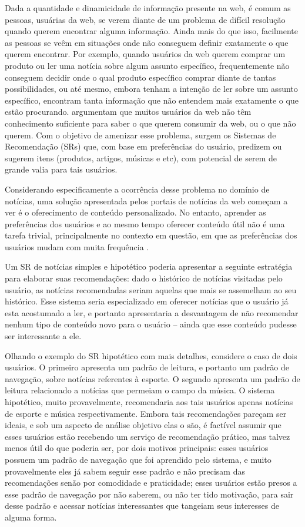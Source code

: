 \documentclass[normaltoc, espacoumemeio, pnumromarab,ruledheader]{abnt}
\begin{document}
Dada a quantidade e dinamicidade de informação presente na web, é comum as pessoas, usuárias da web, se verem diante de um problema de difícil resolução quando querem encontrar alguma informação. Ainda mais do que isso, facilmente as pessoas se veêm em situações onde não conseguem definir exatamente o que querem encontrar. Por exemplo, quando usuários da web querem comprar um produto ou ler uma notícia sobre algum assunto específico, frequentemente não conseguem decidir onde o qual produto específico comprar diante de tantas possibilidades, ou até mesmo, embora tenham a intenção de ler sobre um assunto específico, encontram tanta informação que não entendem mais exatamente o que estão procurando.  argumentam que muitos usuários da web não têm conhecimento suficiente para saber o que querem consumir da web, ou o que não querem. Com o objetivo de amenizar esse problema, surgem os Sistemas de Recomendação (SRs) que, com base em preferências do usuário, predizem ou sugerem itens (produtos, artigos, músicas e etc), com potencial de serem de grande valia para tais usuários.

Considerando especificamente a ocorrência desse problema no domínio de notícias, uma solução apresentada pelos portais de notícias da web começam a ver é o oferecimento de conteúdo personalizado. No entanto, aprender as preferências dos usuários e ao mesmo tempo oferecer conteúdo útil não é uma tarefa trivial, principalmente no contexto em questão, em que as preferências dos usuários mudam com muita frequência \cite{Li2011}.

Um SR de notícias simples e hipotético poderia apresentar a seguinte estratégia para elaborar suas recomendações: dado o histórico de notícias visitadas pelo usuário, as notícias recomendadas seriam aquelas que mais se assemelham ao seu histórico. Esse sistema seria especializado em oferecer notícias que o usuário já esta acostumado a ler, e portanto apresentaria a desvantagem de não recomendar nenhum tipo de conteúdo novo para o usuário -- ainda que esse conteúdo pudesse ser interessante a ele. 

Olhando o exemplo do SR hipotético com mais detalhes, considere o caso de dois usuários. O primeiro apresenta um padrão de leitura, e portanto um padrão de navegação, sobre notícias referentes à esporte. O segundo apresenta um padrão de leitura relacionado a notícias que permeiam o campo da música. O sistema hipotético, muito provavelmente, recomendaria aos tais usuários apenas notícias de esporte e música respectivamente. Embora tais recomendações pareçam ser ideais, e sob um aspecto de análise objetivo elas o são, é factível assumir que esses usuários estão recebendo um serviço de recomendação prático, mas talvez menos útil do que poderia ser, por dois motivos principais: esses usuários possuem um padrão de navegação que foi aprendido pelo sistema, e muito provavelmente eles já sabem seguir esse padrão e não precisam das recomendações senão por comodidade e praticidade; esses usuários estão presos a esse padrão de navegação por não saberem, ou não ter tido motivação, para sair desse padrão e acessar notícias interessantes que tangeiam seus interesses de alguma forma.
\end{document}
